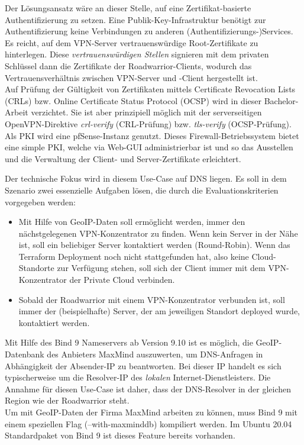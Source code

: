 Der Lösungsansatz wäre an dieser Stelle, auf eine Zertifikat-basierte Authentifizierung zu setzen. Eine Publik-Key-Infrastruktur benötigt zur Authentifizierung keine Verbindungen zu anderen (Authentifizierungs-)Services. Es reicht, auf dem VPN-Server vertrauenswürdige Root-Zertifikate zu hinterlegen. Diese \textit{vertrauenswürdigen Stellen} signieren mit dem privaten Schlüssel dann die Zertifikate der Roadwarrior-Clients, wodurch das Vertrauensverhältnis zwischen VPN-Server und -Client hergestellt ist.\\
Auf Prüfung der Gültigkeit von Zertifikaten mittels Certificate Revocation Lists (CRLs) bzw. Online Certificate Status Protocol (OCSP) wird in dieser Bachelor-Arbeit verzichtet. Sie ist aber prinzipiell möglich mit der serverseitigen OpenVPN-Direktive \textit{crl-verify} (CRL-Prüfung) bzw. \textit{tls-verify} (OCSP-Prüfung).\cite[S.116, S.325-327]{Keijser2011}\\
Als PKI wird eine pfSense-Instanz genutzt. Dieses Firewall-Betriebssystem bietet eine simple PKI, welche via Web-GUI administrierbar ist und so das Ausstellen und die Verwaltung der Client- und Server-Zertifikate erleichtert.\cite[S.376-383]{Netgate2020}

Der technische Fokus wird in diesem Use-Case auf DNS liegen. Es soll in dem Szenario zwei essenzielle Aufgaben lösen, die durch die Evaluationskriterien vorgegeben werden:
\begin{itemize}
\item Mit Hilfe von GeoIP-Daten soll ermöglicht werden, immer den nächstgelegenen VPN-Konzentrator zu finden. Wenn kein Server in der Nähe ist, soll ein beliebiger Server kontaktiert werden (Round-Robin). Wenn das Terraform Deployment noch nicht stattgefunden hat, also keine Cloud-Standorte zur Verfügung stehen, soll sich der Client immer mit dem VPN-Konzentrator der Private Cloud verbinden.
\item Sobald der Roadwarrior mit einem VPN-Konzentrator verbunden ist, soll immer der (beispielhafte) Server, der am jeweiligen Standort deployed wurde, kontaktiert werden.
\end{itemize}

Mit Hilfe des Bind 9 Nameservers ab Version 9.10 ist es möglich, die GeoIP-Datenbank des Anbieters MaxMind auszuwerten, um DNS-Anfragen in Abhängigkeit der Absender-IP zu beantworten. Bei dieser IP handelt es sich typischerweise um die Resolver-IP des \textit{lokalen} Internet-Dienstleisters. Die Annahme für diesen Use-Case ist daher, dass der DNS-Resolver in der gleichen Region wie der Roadwarrior steht.\\
Um mit GeoIP-Daten der Firma MaxMind arbeiten zu können, muss Bind 9 mit einem speziellen Flag (--with-maxminddb) kompiliert werden. Im Ubuntu 20.04 Standardpaket von Bind 9 ist dieses Feature bereits vorhanden.

